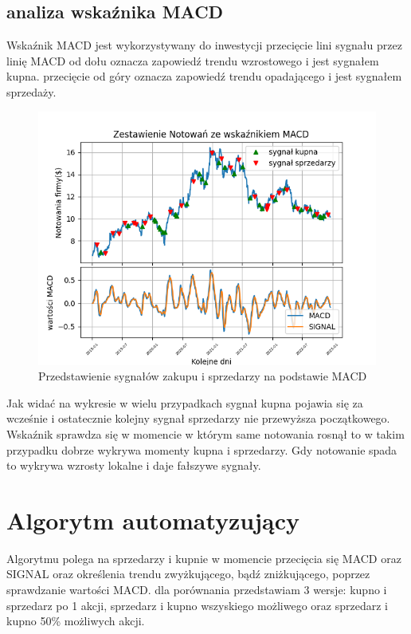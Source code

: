 \documentclass{article}
\begin{document}
    \subsection{analiza wskaźnika MACD}
    Wskaźnik MACD jest wykorzystywany do inwestycji przecięcie lini sygnału przez linię MACD od dołu oznacza zapowiedź trendu wzrostowego i jest sygnałem kupna.
    przecięcie od góry oznacza zapowiedź trendu opadającego i jest sygnałem sprzedaży.
    \begin{figure}[ht]
        \includegraphics[width=\textwidth]{TradeSignals}
        \caption{Przedstawienie sygnałów zakupu i sprzedarzy na podstawie MACD}
        \label{fig:compare}
    \end{figure}
    
    Jak widać na wykresie w wielu przypadkach sygnał kupna pojawia się za wcześnie i ostatecznie kolejny sygnał sprzedarzy nie przewyższa początkowego.
    Wskaźnik sprawdza się w momencie w którym same notowania rosnął to w takim przypadku dobrze wykrywa momenty kupna i sprzedarzy.  Gdy notowanie spada to wykrywa wzrosty lokalne i daje fałszywe sygnały.


    \newpage
    \section{Algorytm automatyzujący}
    Algorytmu polega na sprzedarzy i kupnie w momencie przecięcia się MACD oraz SIGNAL oraz określenia trendu zwyżkującego, bądź zniżkującego, poprzez sprawdzanie wartości MACD.
    dla porównania przedstawiam 3 wersje: kupno i sprzedarz po 1 akcji, sprzedarz i kupno wszyskiego możliwego oraz sprzedarz i kupno 50\% możliwych akcji.
\end{document}
